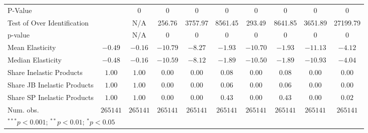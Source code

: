 \begin{tabular}{l c c c c c c c c c}
P-Value                     &               & 0             & 0             & 0             & 0             & 0             & 0             & 0             & 0             \\
Test of Over Identification &               & N/A           & 256.76        & 3757.97       & 8561.45       & 293.49        & 8641.85       & 3651.89       & 27199.79      \\
p-value                     &               & N/A           & 0             & 0             & 0             & 0             & 0             & 0             & 0             \\
Mean Elasticity             & $-0.49$       & $-0.16$       & $-10.79$      & $-8.27$       & $-1.93$       & $-10.70$      & $-1.93$       & $-11.13$      & $-4.12$       \\
Median Elasticity           & $-0.48$       & $-0.16$       & $-10.59$      & $-8.12$       & $-1.89$       & $-10.50$      & $-1.89$       & $-10.93$      & $-4.04$       \\
Share Inelastic Products    & $1.00$        & $1.00$        & $0.00$        & $0.00$        & $0.08$        & $0.00$        & $0.08$        & $0.00$        & $0.00$        \\
Share JB Inelastic Products & $1.00$        & $1.00$        & $0.00$        & $0.00$        & $0.06$        & $0.00$        & $0.06$        & $0.00$        & $0.00$        \\
Share SP Inelastic Products & $1.00$        & $1.00$        & $0.00$        & $0.00$        & $0.43$        & $0.00$        & $0.43$        & $0.00$        & $0.02$        \\
Num. obs.                   & $265141$      & $265141$      & $265141$      & $265141$      & $265141$      & $265141$      & $265141$      & $265141$      & $265141$      \\
\bottomrule
\multicolumn{10}{l}{\scriptsize{$^{***}p<0.001$; $^{**}p<0.01$; $^{*}p<0.05$}}
\end{tabular}
